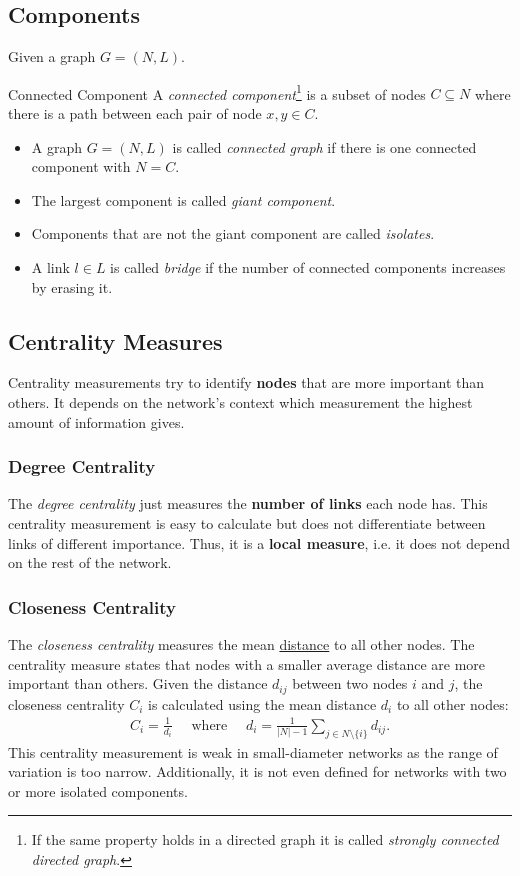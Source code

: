 \documentclass[english]{panikzettel}
\begin{document}
\subsection{Components}\label{sec:components}
Given a graph $ G = (N,L) $.

\begin{defi}{Connected Component}
	A \emph{connected component}\footnote{If the same property holds in a directed graph it is called \emph{strongly connected directed graph}.} is a subset of nodes $ C \subseteq N $ where there is a path between each pair of node $ x,y \in C $.

	\begin{itemize}
		\item A graph $ G = (N,L) $ is called \emph{connected graph} if there is one connected component with $ N = C $.
		\item The largest component is called \emph{giant component}.
		\item Components that are not the giant component are called \emph{isolates}.
		\item A link $ l \in L $ is called \emph{bridge} if the number of connected components increases by erasing it.
	\end{itemize}
\end{defi}

\subsection{Centrality Measures}
Centrality measurements try to identify \textbf{nodes} that are more important than others.
It depends on the network's context which measurement the highest amount of information gives.

\subsubsection{Degree Centrality}
The \emph{degree centrality} just measures the \textbf{number of links} each node has.
This centrality measurement is easy to calculate but does not differentiate between links of different importance.
Thus, it is a \textbf{local measure}, i.e. it does not depend on the rest of the network.

\subsubsection{Closeness Centrality}
The \emph{closeness centrality} measures the mean \hyperref[sec:distance]{distance} to all other nodes.
The centrality measure states that nodes with a smaller average distance are more important than others.
Given the distance $d_{ij}$ between two nodes $i$ and $j$, the closeness centrality $C_i$ is calculated using the mean distance $d_i$ to all other nodes:
\begin{align*}
	C_i = \frac{1}{d_i} \quad\text{ where }\quad d_i = \frac{1}{|N| - 1} \sum\limits_{j \in N \setminus \{i\}} d_{ij}.
\end{align*}
This centrality measurement is weak in small-diameter networks as the range of variation is too narrow.
Additionally, it is not even defined for networks with two or more isolated components.
\end{document}
